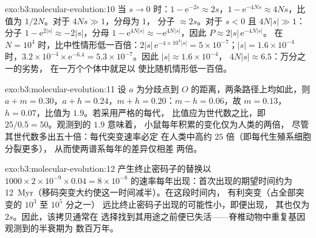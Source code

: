 \begin{solution}{exo:b3:molecular-evolution:10}
当 $s \to 0$ 时：$1 - \mathrm{e}^{-2s} \approx 2s$，$1 - \mathrm{e}^{-4Ns}
\approx 4Ns$，比值为 $1/2N$。对于 $4Ns \gg 1$，分母为 $1$，
分子 $\approx 2s$。对于 $s < 0$ 且 $4N|s| \gg 1$：分子 $1 -
\mathrm{e}^{2|s|} \approx -2|s|$，分母 $1 - \mathrm{e}^{4N|s|} \approx
-\mathrm{e}^{4N|s|}$，因此 $P \approx 2|s|\,\mathrm{e}^{-4N|s|}$。
在 $N = 10^{4}$ 时，比中性情形低一百倍：$2|s|\,\mathrm{e}^{-4\times 10^{4}|s|} =
5\times 10^{-7}$；$|s| = 1.6\times 10^{-4}$ 时，$3.2\times 10^{-4}\times
\mathrm{e}^{-6.4} = 5.3\times 10^{-7}$。因此 $|s| \approx 1.6\times 10^{-4}$，
$4N|s| \approx 6.5$：万分之一的劣势，
在一万个个体中就足以
使比随机情形低一百倍。
\end{solution}

\begin{solution}{exo:b3:molecular-evolution:11}
设 $a$ 为分歧点到 $O$ 的距离，两条路径上均如此，则 $a + m =
0.30$，$a + h = 0.24$，$m + h = 0.20$：$m - h = 0.06$，故 $m = 0.13$，$h
= 0.07$，比值为 $1.9$。若采用严格的每代，
比值应为世代数之比，即 $25/0.5 = 50$。观测到的 $1.9$ 意味着，
小鼠每年积累的变化仅为人类的两倍，
尽管其世代数多出五十倍：每代突变速率必定
在人类中高约 $25$ 倍（即每代生殖系细胞分裂更多），
从而使两谱系每年的差异仅相差
两倍。
\end{solution}

\begin{solution}{exo:b3:molecular-evolution:12}
产生终止密码子的替换以 $1000\times 2\times 10^{-9}\times
0.04 = 8\times 10^{-8}$ 的速率每年出现：首次出现的期望时间约为
\qty{12}{Myr}（移码突变大约使这一时间减半）。在这段时间内，
有利突变（占全部突变的 $10^{3}$ 至 $10^{5}$ 分之一）
远比终止密码子出现的可能性小，即便出现，
其也仅为 $2s$。因此，该拷贝通常在
选择找到其用途之前便已失活——脊椎动物中重复基因观测到的半衰期为
数百万年。
\end{solution}

